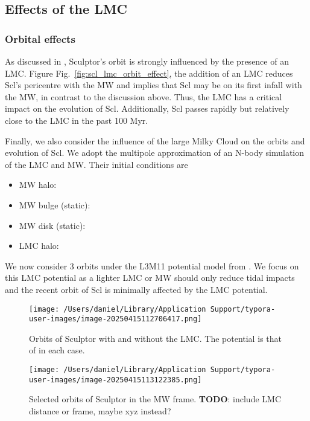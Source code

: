 \subsection{Effects of the LMC}\label{effects-of-the-lmc}

\subsubsection{Orbital effects}\label{orbital-effects}

As discussed in \citet{battaglia+2022}, Sculptor's orbit is strongly
influenced by the presence of an LMC. Figure
Fig.~\ref{fig:scl_lmc_orbit_effect}, the addition of an LMC reduces
Scl's pericentre with the MW and implies that Scl may be on its first
infall with the MW, in contrast to the discussion above. Thus, the LMC
has a critical impact on the evolution of Scl. Additionally, Scl passes
rapidly but relatively close to the LMC in the past 100 Myr.

Finally, we also consider the influence of the large Milky Cloud on the
orbits and evolution of Scl. We adopt the \citet{vasiliev2024} multipole
approximation of an N-body simulation of the LMC and MW. Their initial
conditions are

\begin{itemize}
\tightlist
\item
  MW halo:
\item
  MW bulge (static):
\item
  MW disk (static):
\item
  LMC halo:
\end{itemize}

We now consider 3 orbits under the L3M11 potential model from
\citet{vasiliev2024}. We focus on this LMC potential as a lighter LMC or
MW should only reduce tidal impacts and the recent orbit of Scl is
minimally affected by the LMC potential.

\begin{figure}
\centering
\texttt{[image: /Users/daniel/Library/Application Support/typora-user-images/image-20250415112706417.png]}
\caption[Effect of LMC on Sculptor's Orbit]{Orbits of Sculptor with and
without the LMC. The potential is that of \citet{vasiliev+2021} in each
case.}
\end{figure}

\begin{figure}
\centering
\texttt{[image: /Users/daniel/Library/Application Support/typora-user-images/image-20250415113122385.png]}
\caption[Selected orbits of Sculptor with an LMC]{Selected orbits of
Sculptor in the MW frame. \textbf{TODO}: include LMC distance or frame,
maybe xyz instead?}
\end{figure}

